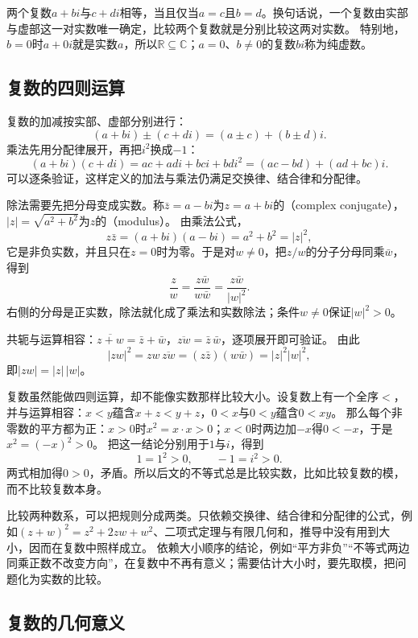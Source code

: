 两个复数$a+bi$与$c+di$相等，当且仅当$a=c$且$b=d$。换句话说，一个复数由实部与虚部这一对实数唯一确定，比较两个复数就是分别比较这两对实数。
特别地，$b=0$时$a+0i$就是实数$a$，所以$\mathbb R\subseteq\mathbb C$；$a=0$、$b\neq0$的复数$bi$称为纯虚数。

\subsection{复数的四则运算}
\label{sec:ru-complex-arithmetic}

复数的加减按实部、虚部分别进行：
\[
 (a+bi)\pm(c+di)=(a\pm c)+(b\pm d)i.
\]
乘法先用分配律展开，再把$i^2$换成$-1$：
\[
 (a+bi)(c+di)=ac+adi+bci+bdi^2=(ac-bd)+(ad+bc)i.
\]
可以逐条验证，这样定义的加法与乘法仍满足交换律、结合律和分配律。

除法需要先把分母变成实数。称$\bar z=a-bi$为$z=a+bi$的（complex conjugate），$|z|=\sqrt{a^2+b^2}$为$z$的（modulus）。
由乘法公式，
\[
 z\bar z=(a+bi)(a-bi)=a^2+b^2=|z|^2,
\]
它是非负实数，并且只在$z=0$时为零。于是对$w\neq0$，把$z/w$的分子分母同乘$\bar w$，得到
\begin{equation}
 \frac zw=\frac{z\bar w}{w\bar w}=\frac{z\bar w}{|w|^2}.
 \label{eq:ru-complex-division}
\end{equation}
右侧的分母是正实数，除法就化成了乘法和实数除法；条件$w\neq0$保证$|w|^2>0$。

共轭与运算相容：$\overline{z+w}=\bar z+\bar w$，$\overline{zw}=\bar z\,\bar w$，逐项展开即可验证。
由此
\[
 |zw|^2=zw\,\overline{zw}=(z\bar z)(w\bar w)=|z|^2|w|^2,
\]
即$|zw|=|z|\,|w|$。

复数虽然能做四则运算，却不能像实数那样比较大小。设复数上有一个全序$<$，并与运算相容：$x<y$蕴含$x+z<y+z$，$0<x$与$0<y$蕴含$0<xy$。
那么每个非零数的平方都为正：$x>0$时$x^2=x\cdot x>0$；$x<0$时两边加$-x$得$0<-x$，于是$x^2=(-x)^2>0$。
把这一结论分别用于$1$与$i$，得到
\[
 1=1^2>0,\qquad -1=i^2>0.
\]
两式相加得$0>0$，矛盾。所以后文的不等式总是比较实数，比如比较复数的模，而不比较复数本身。

比较两种数系，可以把规则分成两类。只依赖交换律、结合律和分配律的公式，例如$(z+w)^2=z^2+2zw+w^2$、二项式定理与有限几何和，推导中没有用到大小，因而在复数中照样成立。
依赖大小顺序的结论，例如“平方非负”“不等式两边同乘正数不改变方向”，在复数中不再有意义；需要估计大小时，要先取模，把问题化为实数的比较。

\subsection{复数的几何意义}
\label{sec:ru-complex-geometry}

